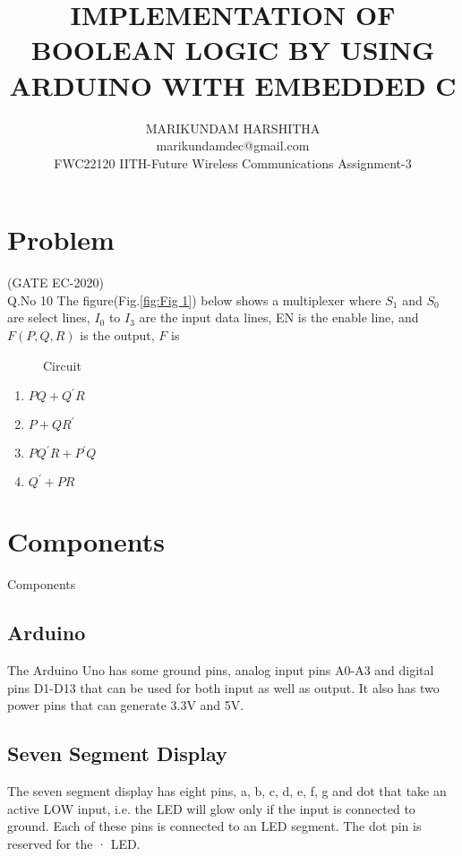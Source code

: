 \documentclass{article}
\title{IMPLEMENTATION OF BOOLEAN LOGIC BY USING ARDUINO WITH EMBEDDED C}
\author{MARIKUNDAM HARSHITHA\\marikundamdec@gmail.com\\FWC22120 IITH-Future Wireless Communications Assignment-3}
\date{}
\begin{document}
\maketitle
\tableofcontents 

\section{Problem}                               
(GATE EC-2020)\\                                  
Q.No 10    The figure(Fig.\ref{fig:Fig 1}) below shows a multiplexer where $S_1$ and $S_0$ are select lines, $I_0$ to $I_3$ are the input data lines, EN is the enable line, and $F(P,Q,R)$ is the output, $F$ is
\begin{figure}[!h]
\begin{center}
\resizebox{0.5\columnwidth}{!}{

}
\end{center}
\caption{Circuit}
\label{fig:Circuit}
\end{figure}

\begin{enumerate}
   \item $PQ +{Q^\prime} R$
   \item $P+Q {R^\prime}$
   \item $P{Q^\prime} R+{P^\prime}Q$
   \item ${Q^\prime} +PR$
\end{enumerate}

\section{Components}
\begin{table}[!h]
\centering

\caption{Components}
\label{table:Components}
\end{table}

\subsection{Arduino}
The Arduino Uno has some ground pins, analog input pins A0-A3 and digital pins D1-D13 that can be used for both input as well as output. It also has two power pins that can generate 3.3V and 5V.
\subsection{Seven Segment Display}
The seven segment display has eight pins, a, b, c, d, e, f, g and dot that take an active LOW input, i.e. the LED will glow only if the input is connected to ground. Each of these pins is connected to an LED segment. The dot pin is reserved for the · LED.
\end{document}
